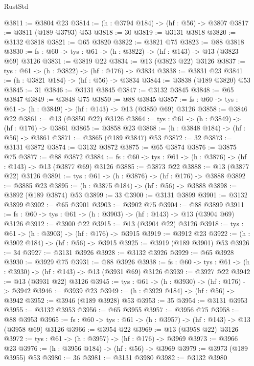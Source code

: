 \begin{lexlean}{RustStd}
\begin{coremodule}
@3811 := @3804 @23
@3814 := (h : @3794 @184) -> (hf : @56) -> @3807
@3817 := @3811 (@189 @3793) @53
@3818 := 30
@3819 := @3131 @3818
@3820 := @3132 @3818
@3821 := @65 @3820
@3822 := @3821 @75
@3823 := @88 @3818
@3830 := {fs : @60} -> {tys : @61} -> (h : @3822) -> (hf : @143) -> @13 (@3823 @69) @3126
@3831 := @3819 @22
@3834 := @13 (@3823 @22) @3126
@3837 := {tys : @61} -> (h : @3822) -> (hf : @176) -> @3834
@3838 := @3831 @23
@3841 := (h : @3821 @184) -> (hf : @56) -> @3834
@3844 := @3838 (@189 @3820) @53
@3845 := 31
@3846 := @3131 @3845
@3847 := @3132 @3845
@3848 := @65 @3847
@3849 := @3848 @75
@3850 := @88 @3845
@3857 := {fs : @60} -> {tys : @61} -> (h : @3849) -> (hf : @143) -> @13 (@3850 @69) @3126
@3858 := @3846 @22
@3861 := @13 (@3850 @22) @3126
@3864 := {tys : @61} -> (h : @3849) -> (hf : @176) -> @3861
@3865 := @3858 @23
@3868 := (h : @3848 @184) -> (hf : @56) -> @3861
@3871 := @3865 (@189 @3847) @53
@3872 := 32
@3873 := @3131 @3872
@3874 := @3132 @3872
@3875 := @65 @3874
@3876 := @3875 @75
@3877 := @88 @3872
@3884 := {fs : @60} -> {tys : @61} -> (h : @3876) -> (hf : @143) -> @13 (@3877 @69) @3126
@3885 := @3873 @22
@3888 := @13 (@3877 @22) @3126
@3891 := {tys : @61} -> (h : @3876) -> (hf : @176) -> @3888
@3892 := @3885 @23
@3895 := (h : @3875 @184) -> (hf : @56) -> @3888
@3898 := @3892 (@189 @3874) @53
@3899 := 33
@3900 := @3131 @3899
@3901 := @3132 @3899
@3902 := @65 @3901
@3903 := @3902 @75
@3904 := @88 @3899
@3911 := {fs : @60} -> {tys : @61} -> (h : @3903) -> (hf : @143) -> @13 (@3904 @69) @3126
@3912 := @3900 @22
@3915 := @13 (@3904 @22) @3126
@3918 := {tys : @61} -> (h : @3903) -> (hf : @176) -> @3915
@3919 := @3912 @23
@3922 := (h : @3902 @184) -> (hf : @56) -> @3915
@3925 := @3919 (@189 @3901) @53
@3926 := 34
@3927 := @3131 @3926
@3928 := @3132 @3926
@3929 := @65 @3928
@3930 := @3929 @75
@3931 := @88 @3926
@3938 := {fs : @60} -> {tys : @61} -> (h : @3930) -> (hf : @143) -> @13 (@3931 @69) @3126
@3939 := @3927 @22
@3942 := @13 (@3931 @22) @3126
@3945 := {tys : @61} -> (h : @3930) -> (hf : @176) -> @3942
@3946 := @3939 @23
@3949 := (h : @3929 @184) -> (hf : @56) -> @3942
@3952 := @3946 (@189 @3928) @53
@3953 := 35
@3954 := @3131 @3953
@3955 := @3132 @3953
@3956 := @65 @3955
@3957 := @3956 @75
@3958 := @88 @3953
@3965 := {fs : @60} -> {tys : @61} -> (h : @3957) -> (hf : @143) -> @13 (@3958 @69) @3126
@3966 := @3954 @22
@3969 := @13 (@3958 @22) @3126
@3972 := {tys : @61} -> (h : @3957) -> (hf : @176) -> @3969
@3973 := @3966 @23
@3976 := (h : @3956 @184) -> (hf : @56) -> @3969
@3979 := @3973 (@189 @3955) @53
@3980 := 36
@3981 := @3131 @3980
@3982 := @3132 @3980

\end{coremodule}
\end{lexlean}
